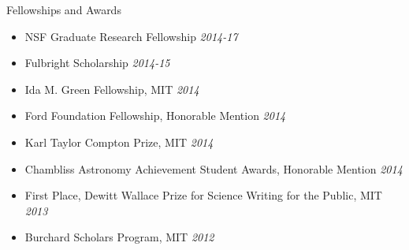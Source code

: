 \documentclass{resume} %
\begin{document}

\begin{rSection}{Fellowships and Awards}

\begin{itemize}
\item
NSF Graduate Research Fellowship \hfill {\em 2014-17}
\item
Fulbright Scholarship \hfill {\em 2014-15}
\item
Ida M. Green Fellowship, MIT \hfill {\em 2014} 
\item
Ford Foundation Fellowship, Honorable Mention \hfill {\em 2014} 
\item
Karl Taylor Compton Prize, MIT \hfill {\em 2014} 
\item
Chambliss Astronomy Achievement Student Awards, Honorable Mention \hfill {\em 2014}
\item
First Place, Dewitt Wallace Prize for Science Writing for the Public, MIT \hfill {\em 2013} 
\item
Burchard Scholars Program, MIT \hfill {\em 2012} \\
\end{itemize}

\end{rSection}

\end{document}

